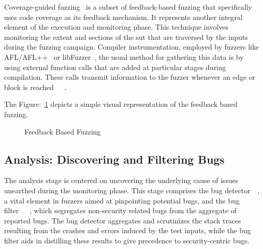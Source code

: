Coverage-guided fuzzing~\cite{jaaskela2016genetic} is a subset of feedback-based
fuzzing that specifically uses code coverage as its feedback mechanism. It represents another integral element of
the execution and monitoring phase. This technique involves monitoring the extent and
sections of the \acrshort{sut} that are traversed by the inputs during the
fuzzing campaign. Compiler instrumentation, employed by fuzzers like
AFL/AFL++~\cite{257204} or libFuzzer~\cite{libFuzze17:online}, the usual method
for gathering this data is by using external function calls that are added at
particular stages during compilation. These calls transmit information to the
fuzzer whenever an edge or block is reached~\cite{libFuzze17:online}~\cite{bohme2016coverage}~\cite{257204}.


The Figure:~\ref{fig:feedback-based-fuzzing} depicts a simple visual representation of the
feedback based fuzzing.


\begin{figure}[h]
        \centering
        \caption{Feedback Based Fuzzing~\cite{TheMagic36:online}\cite{LucianoR49:online}}\label{fig:feedback-based-fuzzing}
\end{figure}

\subsection{Analysis: Discovering and Filtering Bugs}
The analysis stage is centered on uncovering the underlying cause of issues
unearthed during the monitoring phase. This stage comprises the bug
detector~\cite{liang2018fuzzing}~\cite{bekrar2012taint}, a vital element in fuzzers
aimed at pinpointing potential bugs,
and the bug filter~\cite{peng2018t}~\cite{bekrar2012taint}~\cite{chen2013taming},
which segregates non-security related bugs
from the aggregate of reported bugs. The bug detector aggregates and scrutinizes the
stack traces resulting from the crashes and errors induced by the test
inputs, while the bug filter aids in distilling these results to give precedence
to security-centric bugs.

